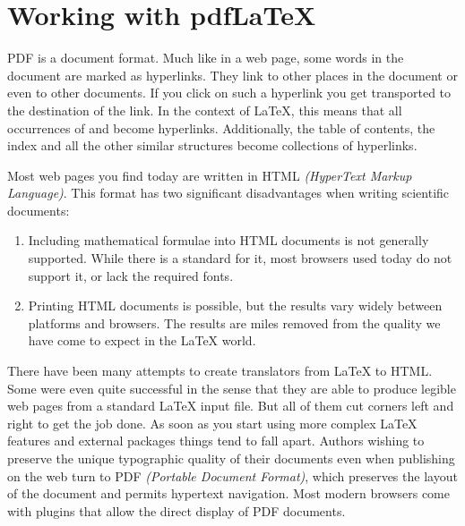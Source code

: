 
\section{Working with pdf\LaTeX} \label{sec:pdftex}
%
PDF is a  document format. Much like in a web page,
some words in the document are marked as hyperlinks. They link to other
places in the document or even to other documents. If you click
on such a hyperlink you get transported to the destination of the
link. In the context of \LaTeX{}, this means that all occurrences of
 and  become hyperlinks. Additionally, the table
of contents, the index and all the other similar structures become
collections of hyperlinks.

Most web pages you find today are written in HTML \emph{(HyperText
  Markup Language)}. This format has two significant disadvantages
when writing scientific documents:
\begin{enumerate}
\item Including mathematical formulae into HTML documents is not
  generally supported. While there is a standard for it, most browsers
  used today do not support it, or lack the required fonts.
\item Printing HTML documents is possible, but the results vary widely
  between platforms and browsers. The results are miles removed from
  the quality we have come to expect in the \LaTeX{} world.
\end{enumerate}

There have been many attempts to create translators from \LaTeX{} to
HTML. Some were even quite successful in the sense that they are able
to produce legible web pages from a standard \LaTeX{} input file. But
all of them cut corners left and right to get the job done. As soon as
you start using more complex \LaTeX{} features and external packages
things tend to fall apart. Authors wishing to preserve the unique
typographic quality of their documents even when publishing on the web
turn to PDF \emph{(Portable Document Format)}, which preserves the 
layout of the document and permits hypertext
navigation. Most modern browsers come with plugins that allow the
direct display of PDF documents.

